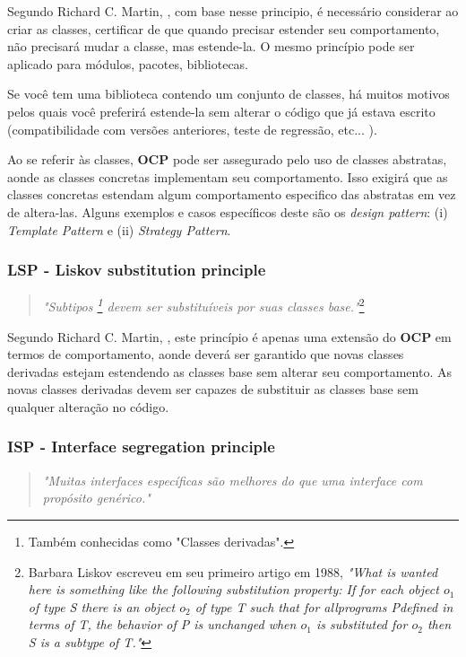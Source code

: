 \documentclass[12pt]{article}
\begin{document}
Segundo Richard C. Martin, \cite{ROBERT_MARTIN_THE_CLEAN_ARCHITECTURE}, com base nesse principio, é necessário considerar ao criar as classes, certificar de que quando precisar estender seu comportamento, não precisará mudar a classe, mas estende-la. O mesmo princípio pode ser aplicado para módulos, pacotes, bibliotecas.

Se você tem uma biblioteca contendo um conjunto de classes, há muitos motivos pelos quais você preferirá estende-la sem alterar o código que já estava escrito (compatibilidade com versões anteriores, teste de regressão, etc... ). 

Ao se referir às classes, \textbf{OCP} pode ser assegurado pelo uso de classes abstratas, aonde as classes concretas implementam seu comportamento. Isso exigirá que as classes concretas estendam algum comportamento especifico das abstratas em vez de altera-las. Alguns exemplos e casos específicos deste são os \textit{design pattern}: (i) \textit{Template Pattern} e (ii) \textit{Strategy Pattern}.

\subsubsection{LSP - Liskov substitution principle}
\begin{quote}
	\textit{"Subtipos \footnote{Também conhecidas como "Classes derivadas".} devem ser substituíveis por suas classes base."}\footnote{Barbara Liskov escreveu em seu primeiro artigo em 1988, \textit{"What is wanted here is something like the following substitution property: If for each object $ o_1 $ of type S there is an object $ o_2 $ of type T such that for allprograms Pdefined in terms of T, the behavior of P is unchanged when $ o_1 $ is substituted for $ o_2 $ then S is a subtype of T."} }	
\end{quote}

Segundo Richard C. Martin, \cite{ROBERT_MARTIN_THE_CLEAN_ARCHITECTURE}, este princípio é apenas uma extensão do \textbf{OCP} em termos de comportamento, aonde deverá ser garantido que novas classes derivadas estejam estendendo as classes base sem alterar seu comportamento. As novas classes derivadas devem ser capazes de substituir as classes base sem qualquer alteração no código.

\subsubsection{ISP - Interface segregation principle}
\begin{quote}
	\textit{"Muitas interfaces específicas são melhores do que uma interface com propósito genérico."}	
\end{quote}
\end{document}
